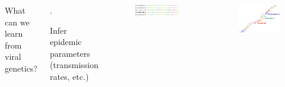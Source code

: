 \documentclass{beamer}
\begin{document}
\begin{frame}

\begin{columns}[c] %


What can we learn from viral genetics?
\begin{itemize}
\scriptsize{
\item .
\item Infer epidemic parameters (transmission rates, etc.)}
\end{itemize}


\begin{figure}
\includegraphics[width=0.9\linewidth]{FluSequence0.png}
\end{figure}
\begin{figure}
\includegraphics[width=0.9\linewidth]{InfluenzaTree0.png}
\end{figure}
\end{columns}

\end{frame}
\end{document}
